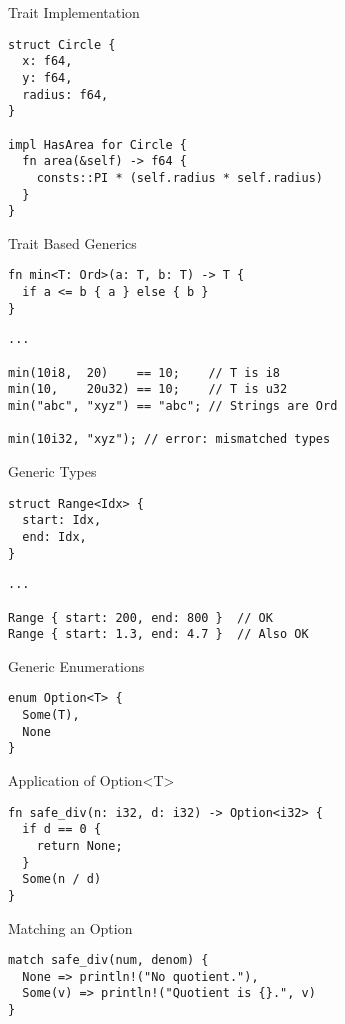 
\begin{frame}[fragile]{Trait Implementation}
\begin{verbatim}
struct Circle {
  x: f64,
  y: f64,
  radius: f64,
}

impl HasArea for Circle {
  fn area(&self) -> f64 {
    consts::PI * (self.radius * self.radius)
  }
}
\end{verbatim}
\end{frame}


\begin{frame}[fragile]{Trait Based Generics}

\begin{verbatim}
fn min<T: Ord>(a: T, b: T) -> T {
  if a <= b { a } else { b }
}
\end{verbatim}
\pause
\begin{verbatim}
...

min(10i8,  20)    == 10;    // T is i8
min(10,    20u32) == 10;    // T is u32
min("abc", "xyz") == "abc"; // Strings are Ord

min(10i32, "xyz"); // error: mismatched types
\end{verbatim}

\end{frame}


\begin{frame}[fragile]{Generic Types}
\begin{verbatim}
struct Range<Idx> {
  start: Idx,
  end: Idx,
}
\end{verbatim}
\pause
\begin{verbatim}
...

Range { start: 200, end: 800 }  // OK
Range { start: 1.3, end: 4.7 }  // Also OK
\end{verbatim}
\end{frame}


\begin{frame}[fragile]{ Generic Enumerations}
\begin{verbatim}
enum Option<T> {
  Some(T),
  None
}
\end{verbatim}
\end{frame}


\begin{frame}[fragile]{Application of Option<T>}
\begin{verbatim}
fn safe_div(n: i32, d: i32) -> Option<i32> {
  if d == 0 {
    return None;
  }
  Some(n / d)
}
\end{verbatim}
\end{frame}


\begin{frame}[fragile]{Matching an Option}
\begin{verbatim}
match safe_div(num, denom) {
  None => println!("No quotient."),
  Some(v) => println!("Quotient is {}.", v)
}
\end{verbatim}
\end{frame}


